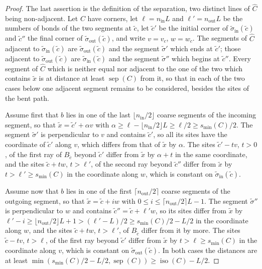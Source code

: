 \documentclass[11pt]{article}
\newcommand{\iso}{\operatorname{iso}}
\newcommand{\sep}{\operatorname{sep}}
\numberwithin{equation}{section}
\theoremstyle{remark}
\theoremstyle{plain}
\begin{document}
\begin{proof}
The last assertion is the definition of the separation, two distinct lines of $\widehat C$ being non-adjacent. Let $C$ have corners, let $\ell= n_{\mathrm{in}}L$ and $\ell'= n_{\mathrm{out}}L$ be the numbers of bonds of the two segments at $\tilde c$, let $\tilde c'$ be the initial corner of $\tilde\sigma_{\mathrm{in}}(\tilde c)$ and $\tilde c''$ the final corner of $\tilde\sigma_{\mathrm{out}}(\tilde c)$, and write $v= v_c$, $w= w_c$. The segments of $\widehat C$ adjacent to $\tilde\sigma_{\mathrm{in}}(\tilde c)$ are $\tilde\sigma_{\mathrm{out}}(\tilde c)$ and the segment $\tilde\sigma'$ which ends at $\tilde c'$; those adjacent to $\tilde\sigma_{\mathrm{out}}(\tilde c)$ are $\tilde\sigma_{\mathrm{in}}(\tilde c)$ and the segment $\tilde\sigma''$ which begins at $\tilde c''$. Every segment of $\widehat C$ which is neither equal nor adjacent to the one of the two which contains $\tilde x$ is at distance at least $\sep(C)$ from it, so that in each of the two cases below one adjacent segment remains to be considered, besides the sites of the bent path.

Assume first that $b$ lies in one of the last $\lfloor n_{\mathrm{in}}/2\rfloor$ coarse segments of the incoming segment, so that $\tilde x=\tilde c'+\alpha v$ with $\alpha\geqslant \ell-\lfloor n_{\mathrm{in}}/2\rfloor L\geqslant \ell/2\geqslant s_{\min}(C)/2$. The segment $\tilde\sigma'$ is perpendicular to $v$ and contains $\tilde c'$, so all its sites have the coordinate of $\tilde c'$ along $v$, which differs from that of $\tilde x$ by $\alpha$. The sites $\tilde c'-tv$, $t>0$, of the first ray of $B_{\tilde c}$ beyond $\tilde c'$ differ from $\tilde x$ by $\alpha+t$ in the same coordinate, and the sites $\tilde c+tw$, $t>\ell'$, of the second ray beyond $\tilde c''$ differ from $\tilde x$ by $t>\ell'\geqslant s_{\min}(C)$ in the coordinate along $w$, which is constant on $\tilde\sigma_{\mathrm{in}}(\tilde c)$.

Assume now that $b$ lies in one of the first $\lceil n_{\mathrm{out}}/2\rceil$ coarse segments of the outgoing segment, so that $\tilde x=\tilde c+iw$ with $0\leqslant i\leqslant \lceil n_{\mathrm{out}}/2\rceil L-1$. The segment $\tilde\sigma''$ is perpendicular to $w$ and contains $\tilde c''=\tilde c+\ell'w$, so its sites differ from $\tilde x$ by $\ell'-i\geqslant \lfloor n_{\mathrm{out}}/2\rfloor L+1>(\ell'-L)/2\geqslant s_{\min}(C)/2-L/2$ in the coordinate along $w$, and the sites $\tilde c+tw$, $t>\ell'$, of $B_{\tilde c}$ differ from it by more. The sites $\tilde c-tv$, $t>\ell$, of the first ray beyond $\tilde c'$ differ from $\tilde x$ by $t>\ell\geqslant s_{\min}(C)$ in the coordinate along $v$, which is constant on $\tilde\sigma_{\mathrm{out}}(\tilde c)$. In both cases the distances are at least $\min(s_{\min}(C)/2-L/2,\sep(C))\geqslant \iso(C)-L/2$.
\end{proof}
\end{document}

